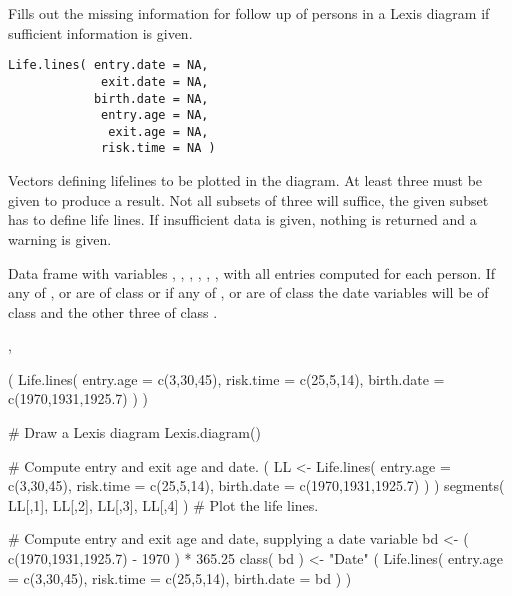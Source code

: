 \begin{Description}\relax
Fills out the missing information for follow up of persons in a Lexis
diagram if sufficient information is given.
\end{Description}
\begin{Usage}
\begin{verbatim}
Life.lines( entry.date = NA,
             exit.date = NA,
            birth.date = NA,
             entry.age = NA,
              exit.age = NA,
             risk.time = NA )
\end{verbatim}
\end{Usage}
\begin{Arguments}
\begin{ldescription}
\item[\code{entry.date, exit.date,birth.date, entry.age, exit.age,
risk.time}] Vectors defining lifelines to be plotted 
in the diagram. At least three must be given to produce a result.
Not all subsets of three will suffice, the given subset has to 
define life lines. If insufficient data is given, nothing is
returned and a warning is given.
\end{ldescription}
\end{Arguments}
\begin{Value}
Data frame with variables , ,
, , ,
, with all entries computed for each person. If any
of ,  or  are of
class  or if any of ,  or
 are of class  the date variables will
be of class   and the other three of class
.
\end{Value}
\begin{SeeAlso}\relax
{},
\end{SeeAlso}
\begin{Examples}
\begin{ExampleCode}
( Life.lines( entry.age = c(3,30,45),
              risk.time = c(25,5,14),
             birth.date = c(1970,1931,1925.7) ) )

# Draw a Lexis diagram
Lexis.diagram()

# Compute entry and exit age and date.
( LL <-  Life.lines( entry.age = c(3,30,45),
                     risk.time = c(25,5,14),
                    birth.date = c(1970,1931,1925.7) ) )
segments( LL[,1], LL[,2], LL[,3], LL[,4] ) # Plot the life lines.

# Compute entry and exit age and date, supplying a date variable
bd <- ( c(1970,1931,1925.7) - 1970 ) * 365.25
class( bd ) <- "Date"
( Life.lines( entry.age = c(3,30,45),
              risk.time = c(25,5,14),
             birth.date = bd ) )
\end{ExampleCode}
\end{Examples}


